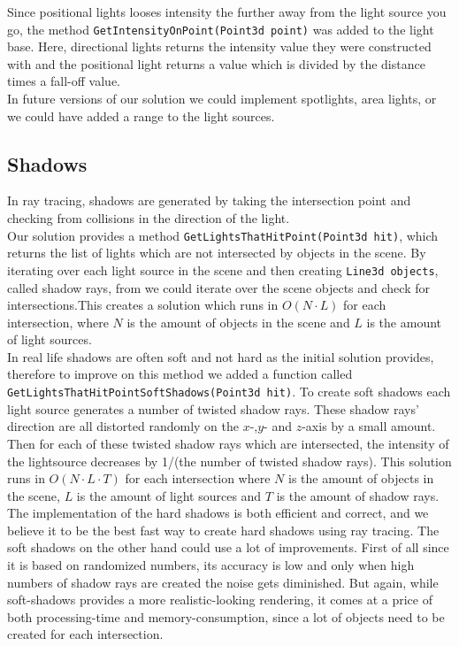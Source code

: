 Since positional lights looses intensity the further away from the light source you go, the method \texttt{GetIntensityOnPoint(Point3d point)} was added to the light base. Here, directional lights returns the intensity value they were constructed with and the positional light returns a value which is divided by the distance times a fall-off value.\\

In future versions of our solution we could implement spotlights, area lights, or we could have added a range to the light sources. 

\subsection{Shadows}
In ray tracing, shadows are generated by taking the intersection point and checking from collisions in the direction of the light. \\
Our solution provides a method \texttt{GetLightsThatHitPoint(Point3d hit)}, which returns the list of lights which are not intersected by objects in the scene. By iterating over each light source in the scene and then creating \texttt{Line3d objects}, called shadow rays, from we could iterate over the scene objects and check for intersections.This creates a solution which runs in $O(N \cdot L)$ for each intersection, where $N$ is the amount of objects in the scene and $L$ is the amount of light sources. \\

In real life shadows are often soft and not hard as the initial solution provides, therefore to improve on this method we added a function called \texttt{GetLightsThatHitPointSoftShadows(Point3d hit)}. To create soft shadows each light source generates a number of twisted shadow rays. These shadow rays’ direction are all distorted randomly on the $x$-,$y$- and $z$-axis by a small amount. Then for each of these twisted shadow rays which are intersected, the intensity of the lightsource decreases by 1/(the number of twisted shadow rays). This solution runs in $O(N \cdot L \cdot T)$ for each intersection where $N$ is the amount of objects in the scene, $L$ is the amount of light sources and $T$ is the amount of shadow rays. \\

The implementation of the hard shadows is both efficient and correct, and we believe it to be the best fast way to create hard shadows using ray tracing. The soft shadows on the other hand could use a lot of improvements. First of all since it is based on randomized numbers, its accuracy is low and only when high numbers of shadow rays are created the noise gets diminished. But again, while soft-shadows provides a more realistic-looking rendering, it comes at a price of both processing-time and memory-consumption, since a lot of objects need to be created for each intersection.

